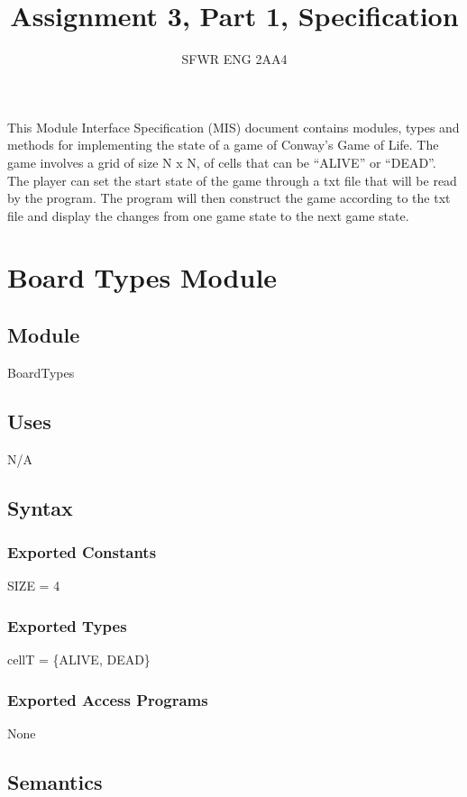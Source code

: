 \documentclass[12pt]{article}
\title{Assignment 3, Part 1, Specification}
\author{SFWR ENG 2AA4}
\begin{document}
\maketitle
This Module Interface Specification (MIS) document contains modules, types and
methods for implementing the state of a game of Conway's Game of Life. The game involves a grid of size N x N, of cells that can be ``ALIVE'' or ``DEAD''. The player can set the start state of the game through a txt file that will be read by the program. The program will then construct the game according to the txt file and display the changes from one game state to the next game state.


\newpage

\section* {Board Types Module}

\subsection*{Module}

BoardTypes

\subsection* {Uses}

N/A

\subsection* {Syntax}

\subsubsection* {Exported Constants}
SIZE = 4

\subsubsection* {Exported Types}
cellT = \{ALIVE, DEAD\} 

\subsubsection* {Exported Access Programs}

None

\subsection* {Semantics}
\end{document}
